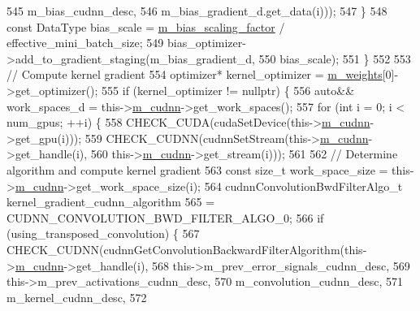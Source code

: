 \begin{DoxyCode}
545                                                  m\_bias\_cudnn\_desc,
546                                                  m\_bias\_gradient\_d.get\_data(i)));
547       \}
548       \textcolor{keyword}{const} DataType bias\_scale = \hyperlink{classlbann_1_1base__convolution__layer_a5abe0bcd128b66a41fa481b28a9c2104}{m\_bias\_scaling\_factor} / effective\_mini\_batch\_size;
549       bias\_optimizer->add\_to\_gradient\_staging(m\_bias\_gradient\_d,
550                                               bias\_scale);
551     \}
552 
553     \textcolor{comment}{// Compute kernel gradient}
554     optimizer* kernel\_optimizer = \hyperlink{classlbann_1_1Layer_a7954e30fbf9100a6ba4b56d02767a469}{m\_weights}[0]->get\_optimizer();
555     \textcolor{keywordflow}{if} (kernel\_optimizer != \textcolor{keyword}{nullptr}) \{
556       \textcolor{keyword}{auto}&& work\_spaces\_d = this->\hyperlink{classlbann_1_1Layer_a08dbb94239e3b8c96329786c57c72e21}{m\_cudnn}->get\_work\_spaces();
557       \textcolor{keywordflow}{for} (\textcolor{keywordtype}{int} i = 0; i < num\_gpus; ++i) \{
558         CHECK\_CUDA(cudaSetDevice(this->\hyperlink{classlbann_1_1Layer_a08dbb94239e3b8c96329786c57c72e21}{m\_cudnn}->get\_gpu(i)));
559         CHECK\_CUDNN(cudnnSetStream(this->\hyperlink{classlbann_1_1Layer_a08dbb94239e3b8c96329786c57c72e21}{m\_cudnn}->get\_handle(i),
560                                    this->\hyperlink{classlbann_1_1Layer_a08dbb94239e3b8c96329786c57c72e21}{m\_cudnn}->get\_stream(i)));
561 
562         \textcolor{comment}{// Determine algorithm and compute kernel gradient}
563         \textcolor{keyword}{const} \textcolor{keywordtype}{size\_t} work\_space\_size = this->\hyperlink{classlbann_1_1Layer_a08dbb94239e3b8c96329786c57c72e21}{m\_cudnn}->get\_work\_space\_size(i);
564         cudnnConvolutionBwdFilterAlgo\_t kernel\_gradient\_cudnn\_algorithm
565           = CUDNN\_CONVOLUTION\_BWD\_FILTER\_ALGO\_0;
566         \textcolor{keywordflow}{if} (using\_transposed\_convolution) \{
567           CHECK\_CUDNN(cudnnGetConvolutionBackwardFilterAlgorithm(this->\hyperlink{classlbann_1_1Layer_a08dbb94239e3b8c96329786c57c72e21}{m\_cudnn}->get\_handle(i),
568                                                                  this->m\_prev\_error\_signals\_cudnn\_desc,
569                                                                  this->m\_prev\_activations\_cudnn\_desc,
570                                                                  m\_convolution\_cudnn\_desc,
571                                                                  m\_kernel\_cudnn\_desc,
572                                                                  

\end{DoxyCode}
